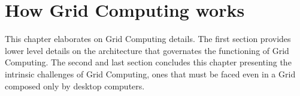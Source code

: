 \chapter{How Grid Computing works}
This chapter elaborates on Grid Computing details. The first section provides lower level details on the architecture that governates the functioning of Grid Computing. The second and last section concludes this chapter presenting the intrinsic challenges of Grid Computing, ones that must be faced even in a Grid composed only by desktop computers.



